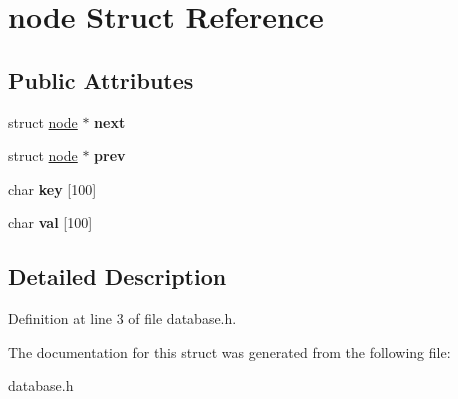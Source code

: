 \hypertarget{structnode}{
\section{node Struct Reference}
\label{structnode}
}
\subsection*{Public Attributes}
\begin{DoxyCompactItemize}
\item 
\hypertarget{structnode_aa3e8aa83f864292b5a01210f4453fcc0}{
struct \hyperlink{structnode}{node} $\ast$ {\bfseries next}}
\label{structnode_aa3e8aa83f864292b5a01210f4453fcc0}

\item 
\hypertarget{structnode_a7ee3d227c728ce18a86e43ebc301046e}{
struct \hyperlink{structnode}{node} $\ast$ {\bfseries prev}}
\label{structnode_a7ee3d227c728ce18a86e43ebc301046e}

\item 
\hypertarget{structnode_a5fd1b611eff9ac013e06822267cfa56b}{
char {\bfseries key} \mbox{[}100\mbox{]}}
\label{structnode_a5fd1b611eff9ac013e06822267cfa56b}

\item 
\hypertarget{structnode_a69763b61627e4805282db7f528fc4fb2}{
char {\bfseries val} \mbox{[}100\mbox{]}}
\label{structnode_a69763b61627e4805282db7f528fc4fb2}

\end{DoxyCompactItemize}


\subsection{Detailed Description}


Definition at line 3 of file database.h.



The documentation for this struct was generated from the following file:\begin{DoxyCompactItemize}
\item 
database.h\end{DoxyCompactItemize}
